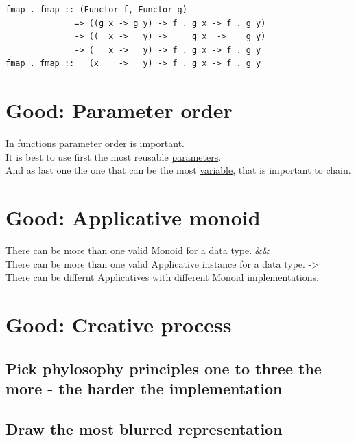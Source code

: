 \documentclass[a4paper,14pt,oneside]{book}
\begin{document}
{\begin{verbatim}
fmap . fmap :: (Functor f, Functor g)
              => ((g x -> g y) -> f . g x -> f . g y)
              -> ((  x ->   y) ->     g x  ->    g y)
              -> (   x ->   y) -> f . g x -> f . g y
fmap . fmap ::   (x    ->   y) -> f . g x -> f . g y
\end{verbatim}

\chapter{\label{org94b6101}Good: Parameter order}
\label{sec:orge41e321}
In \hyperref[orgf33f5fb]{functions} \hyperref[org0db8baa]{parameter} \hyperref[orgb3255b0]{order} is important.\\
It is best to use first the most reusable \hyperref[org1f91d4a]{parameters}.\\
And as last one the one that can be the most \hyperref[org82b2aef]{variable}, that is important to chain.\\

\chapter{\label{orgbaf57b6}Good: Applicative monoid}
\label{sec:orgb37c850}
There can be more than one valid \hyperref[orgcf84af2]{Monoid} for a \hyperref[org3de168a]{data type}. \&\&\\
There can be more than one valid \hyperref[org812e4b8]{Applicative} instance for a \hyperref[org3de168a]{data type}. ->\\
There can be differnt \hyperref[orgecd56fa]{Applicatives} with different \hyperref[orgcf84af2]{Monoid} implementations.\\

\chapter{\label{org93aa382}Good: Creative process}
\label{sec:org3bf4bff}
\section{Pick phylosophy principles one to three the more - the harder the implementation}
\label{sec:orga3fc465}

\section{Draw the most blurred representation}
\label{sec:org27e13d4}

}
\end{document}
